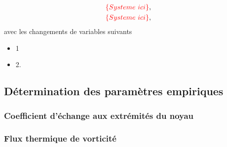 \begin{subequations}
	\begin{align}
		\textcolor{red}{\{Systeme\ ici\}},\label{eq:1_LottonPoignand}\\
		\textcolor{red}{\{Systeme\ ici\}},\label{eq:2_LottonPoignand}
	\end{align}
	\label{eq:SystemeEq_LottonPoignand}
\end{subequations}
avec les changements de variables suivants

\begin{itemize} \color{red}
	\item 1
	\item 2.
\end{itemize}

\subsection{Détermination des paramètres empiriques}
\subsubsection{Coefficient d'échange aux extrémités du noyau}

\subsubsection{Flux thermique de vorticité}
